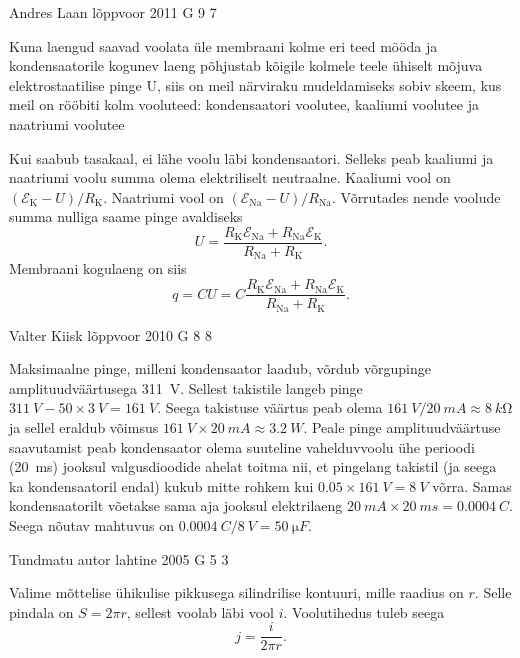 \documentclass[11pt, twoside]{article}
\begin{document}
{%
{Andres Laan} %
{lõppvoor} %
{2011} %
{G 9} %
{7} %
{

\ifSolution
Kuna laengud saavad voolata üle membraani kolme eri teed mööda ja kondensaatorile kogunev laeng põhjustab kõigile kolmele teele ühiselt mõjuva elektrostaatilise
pinge U, siis on meil närviraku mudeldamiseks sobiv skeem, kus meil on rööbiti kolm
vooluteed: kondensaatori voolutee, kaaliumi voolutee ja naatriumi voolutee


Kui saabub tasakaal, ei lähe voolu läbi kondensaatori. Selleks peab kaaliumi ja naatriumi voolu summa olema elektriliselt neutraalne. Kaaliumi vool on $(\mathcal{E}_{\mathrm{K}} - U)/R_\mathrm{K}$.
Naatriumi vool on $(\mathcal{E}_{\mathrm{Na}} - U)/R_{\mathrm{Na}}$. Võrrutades nende voolude summa nulliga saame
pinge avaldiseks
\[
U=\frac{R_{\mathrm{K}} \mathcal{E}_{\mathrm{Na}}+R_{\mathrm{Na}} \mathcal{E}_{\mathrm{K}}}{R_{\mathrm{Na}}+R_{\mathrm{K}}}.
\]
Membraani kogulaeng on siis
\[
q=C U=C \frac{R_{\mathrm{K}} \mathcal{E}_{\mathrm{Na}}+R_{\mathrm{Na}} \mathcal{E}_{\mathrm{K}}}{R_{\mathrm{Na}}+R_{\mathrm{K}}}.
\]
\fi
}

{Valter Kiisk} %
{lõppvoor} %
{2010} %
{G 8} %
{8} %
{

\ifSolution
Maksimaalne pinge, milleni kondensaator laadub, võrdub võrgupinge
amplituudväärtusega \SI{311}{V}. Sellest takistile langeb pinge
$\SI{311}{V}-\num{50}\times\SI{3}{V}=\SI{161}{V}$. Seega takistuse väärtus peab olema
$\SI{161}{V}/\SI{20}{mA}\approx\SI{8}{k\ohm}$ ja sellel eraldub võimsus
$\SI{161}{V}\times\SI{20}{mA}\approx\SI{3.2}{W}$. Peale pinge amplituudväärtuse
saavutamist peab kondensaator olema suuteline vahelduvvoolu ühe perioodi (\SI{20}{ms})
jooksul valgusdioodide ahelat toitma nii, et pingelang takistil (ja seega ka
kondensaatoril endal) kukub mitte rohkem kui $\num{0.05}\times\SI{161}{V}=\SI{8}{V}$
võrra. Samas kondensaatorilt võetakse sama aja jooksul elektrilaeng
$\SI{20}{mA}\times\SI{20}{ms}=\SI{0.0004}{C}$. Seega nõutav mahtuvus on
$\SI{0.0004}{C}/\SI{8}{V}=\SI{50}{\micro F}$.
\fi
}

{Tundmatu autor} %
{lahtine} %
{2005} %
{G 5} %
{3} %
{

\ifSolution
Valime mõttelise ühikulise pikkusega silindrilise kontuuri, mille raadius on $r$. Selle
pindala on $S = 2\pi r$, sellest voolab läbi vool $i$. Voolutihedus tuleb seega
\[
j = \frac{i}{2\pi r}.
\]
\fi
}

}
\end{document}
